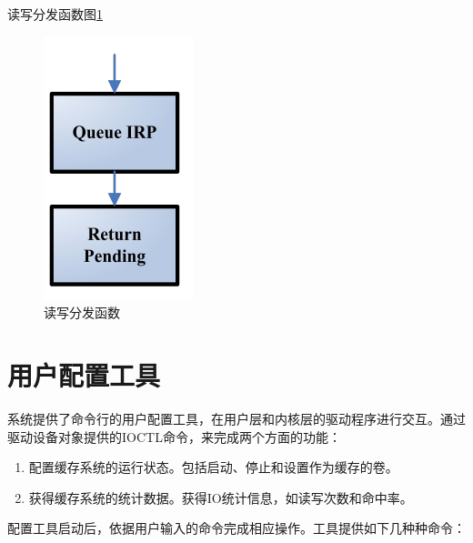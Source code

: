 \begin{enumerate}
读写分发函数图\ref{fig:df-rw}

\begin{figure}[h]
\centering
\includegraphics[width=0.2\linewidth]{./graph/df-rw}
\caption{读写分发函数}
\label{fig:df-rw}
\end{figure}

\end{enumerate}


\section{用户配置工具}
\label{sec:config_utility}

系统提供了命令行的用户配置工具，在用户层和内核层的驱动程序进行交互。通过驱动设备对象提供的IOCTL命令，来完成两个方面的功能：
\begin{enumerate}
\item 配置缓存系统的运行状态。包括启动、停止和设置作为缓存的卷。
\item 获得缓存系统的统计数据。获得IO统计信息，如读写次数和命中率。
\end{enumerate}

配置工具启动后，依据用户输入的命令完成相应操作。工具提供如下几种种命令：

